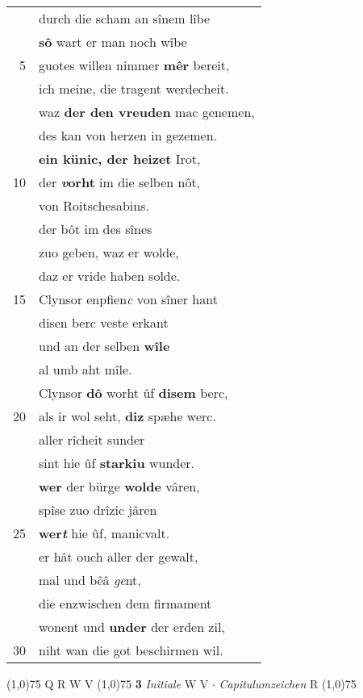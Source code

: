 \documentclass[8pt,a4paper,notitlepage]{article}
\begin{document}
\begin{table}[ht]
\begin{minipage}[t]{0.5\linewidth}
\begin{tabular}{rl}
 & durch die scham an sînem lîbe\\ 
 & \textbf{sô} wart er man noch wîbe\\ 
5 & guotes willen nimmer \textbf{mêr} bereit,\\ 
 & ich meine, die tragent werdecheit.\\ 
 & waz \textbf{der den vreuden} mac genemen,\\ 
 & des kan von herzen in gezemen.\\ 
 & \textbf{ein künic, der heizet} Irot,\\ 
10 & der \textbf{\textit{v}orht} im die selben nôt,\\ 
 & von Roitschesabins.\\ 
 & der bôt im des sînes\\ 
 & zuo geben, waz er wolde,\\ 
 & daz er vride haben solde.\\ 
15 & Clynsor enpfien\textit{c} von sîner hant\\ 
 & disen berc veste erkant\\ 
 & und an der selben \textbf{wîle}\\ 
 & al umb aht mîle.\\ 
 & Clynsor \textbf{dô} worht ûf \textbf{disem} berc,\\ 
20 & als ir wol seht, \textbf{diz} spæhe werc.\\ 
 & aller rîcheit sunder\\ 
 & sint hie ûf \textbf{starkiu} wunder.\\ 
 & \textbf{wer} der bürge \textbf{wolde} vâren,\\ 
 & spîse zuo drîzic jâren\\ 
25 & \textbf{wer\textit{t}} hie ûf, manicvalt.\\ 
 & er hât ouch aller der gewalt,\\ 
 & mal und bêâ \textit{ge}nt,\\ 
 & die enzwischen dem firmament\\ 
 & wonent und \textbf{under} der erden zil,\\ 
30 & niht wan die got beschirmen wil.\\ 
\end{tabular}
\scriptsize
\line(1,0){75} \newline
Q R W V \newline
\line(1,0){75} \newline
\textbf{3} \textit{Initiale} W V   $\cdot$ \textit{Capitulumzeichen} R  \newline
\line(1,0){75} \newline

\end{minipage}
\end{table}
\end{document}
